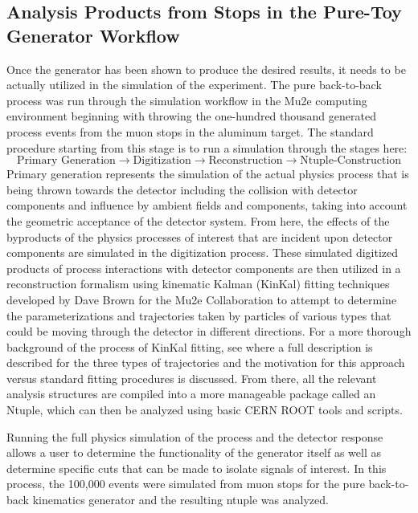 \documentclass[12pt]{article}
\begin{document}
\subsection{Analysis Products from Stops in the Pure-Toy Generator Workflow} \label{subsec:AnalysisProductsPure}
Once the generator has been shown to produce the desired results, it needs to be actually utilized in the simulation of the experiment. The pure back-to-back process was run through the simulation workflow in the Mu2e computing environment beginning with throwing the one-hundred thousand generated process events from the muon stops in the aluminum target. The standard procedure starting from this stage is to run a simulation through the stages here:
\begin{equation}\label{eqn:workflowSteps}
    \text{Primary Generation} \to \text{Digitization} \to \text{Reconstruction} \to \text{Ntuple-Construction}
\end{equation}
Primary generation represents the simulation of the actual physics process that is being thrown towards the detector including the collision with detector components and influence by ambient fields and components, taking into account the geometric acceptance of the detector system. From here, the effects of the byproducts of the physics processes of interest that are incident upon detector components are simulated in the digitization process. These simulated digitized products of process interactions with detector components are then utilized in a reconstruction formalism using kinematic Kalman (KinKal) fitting techniques developed by Dave Brown for the Mu2e Collaboration to attempt to determine the parameterizations and trajectories taken by particles of various types that could be moving through the detector in different directions. For a more thorough background of the process of KinKal fitting, see \cite{Brown2024KinKal} where a full description is described for the three types of trajectories and the motivation for this approach versus standard fitting procedures is discussed. From there, all the relevant analysis structures are compiled into a more manageable package called an Ntuple, which can then be analyzed using basic CERN ROOT tools and scripts.

Running the full physics simulation of the process and the detector response allows a user to determine the functionality of the generator itself as well as determine specific cuts that can be made to isolate signals of interest. In this process, the 100,000 events were simulated from muon stops for the pure back-to-back kinematics generator and the resulting ntuple was analyzed. 
\end{document}
